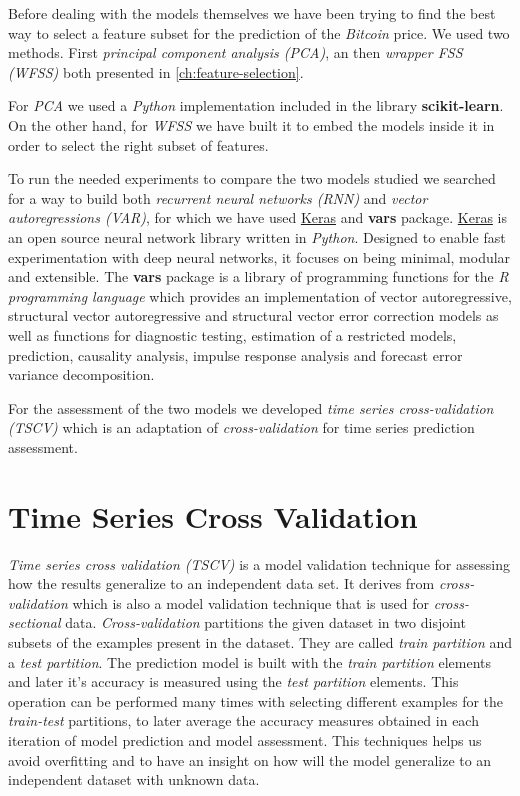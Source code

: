 
Before dealing with the models themselves we have been trying to find
the best way to select a feature subset for the prediction of the
\textit{Bitcoin} price. We used two methods. First \textit{principal
component analysis (PCA)}, an then \textit{wrapper FSS (WFSS)} both
presented in \autoref{ch:feature-selection}.

For \textit{PCA} we used a \textit{Python} implementation included in
the library \textbf{scikit-learn}. On the other hand, for
\textit{WFSS} we have built it to embed the models inside it in order
to select the right subset of features.

To run the needed experiments to compare the two models studied we
searched for a way to build both \textit{recurrent neural networks
(RNN)} and \textit{vector autoregressions (VAR)}, for which we have
used \href{http://www.keras.io}{Keras} and \textbf{vars} package.
\href{http://www.keras.io}{Keras} is an open source neural network
library written in \textit{Python}. Designed to enable fast
experimentation with deep neural networks, it focuses on being
minimal, modular and extensible. The \textbf{vars} package is a
library of programming functions for the \textit{R programming
language} which provides an implementation of vector autoregressive,
structural vector autoregressive and structural vector error
correction models as well as functions for diagnostic testing,
estimation of a restricted models, prediction, causality analysis,
impulse response analysis and forecast error variance decomposition.

For the assessment of the two models we developed \textit{time series
cross-validation (TSCV)} which is an adaptation of
\textit{cross-validation} for time series prediction assessment.

\chapter{Time Series Cross Validation}
\label{ch:tscv}

\textit{Time series cross validation (TSCV)} is a model validation
technique for assessing how the results generalize to an independent
data set. It derives from \textit{cross-validation} which is also a
model validation technique that is used for \textit{cross-sectional}
data. \textit{Cross-validation} partitions the given dataset in two
disjoint subsets of the examples present in the dataset. They are
called \textit{train partition} and a \textit{test partition}. The
prediction model is built with the \textit{train partition} elements
and later it's accuracy is measured using the \textit{test partition}
elements. This operation can be performed many times with selecting
different examples for the \textit{train-test} partitions, to later
average the accuracy measures obtained in each iteration of model
prediction and model assessment. This techniques helps us avoid
overfitting and to have an insight on how will the model generalize to
an independent dataset with unknown data.

